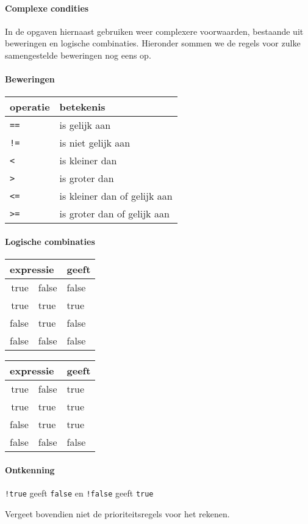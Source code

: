 \paragraph{Complexe condities}
In de opgaven hiernaast gebruiken weer complexere voorwaarden, bestaande uit beweringen en logische combinaties. Hieronder sommen we de regels voor zulke samengestelde beweringen nog eens op.

\paragraph{Beweringen}
\begin{center}
\begin{tabular}{ll}
\textbf{operatie} &        \textbf{betekenis}\\
\midrule
      \texttt{==} &               is gelijk aan\\
      \texttt{!=} &          is niet gelijk aan\\
       \texttt{<} &              is kleiner dan\\
       \texttt{>} &               is groter dan\\
      \texttt{<=} & is kleiner dan of gelijk aan\\
      \texttt{>=} & is groter dan of gelijk aan\\
\midrule
\end{tabular}
\end{center}

\paragraph{Logische combinaties}
\begin{center}
  \ttfamily
  \begin{tabular}{r@{ \&\& }l@{\qquad}l}
    \multicolumn{2}{l}{\normalfont expressie} & {\normalfont geeft} \\
    \midrule
    true & false & false \\
    true & true   & true \\
    false & true  & false \\
    false & false  & false \\
    \midrule
  \end{tabular}
  \qquad
  \begin{tabular}{r@{ || }l@{\qquad}l}
    \multicolumn{2}{l}{\normalfont expressie} & {\normalfont geeft} \\
    \midrule
    true  & false  & true \\
    true  & true   & true \\
    false & true   & true \\
    false & false  & false \\
    \midrule
  \end{tabular}
\end{center}

\paragraph{Ontkenning}
\begin{center}
  \texttt{!true} \quad  geeft \quad  \texttt{false} \qquad  en \qquad  \texttt{!false} \quad geeft \quad \texttt{true}
\end{center}

Vergeet bovendien niet de prioriteitsregels voor het rekenen.
